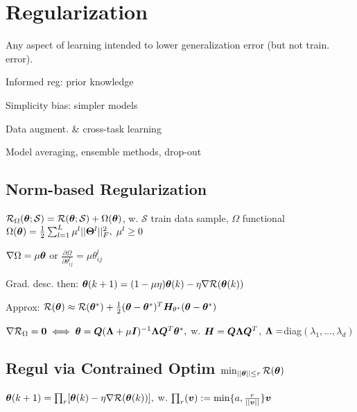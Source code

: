 \section{Regularization}
 Any aspect of learning intended to lower generalization error (but not train. error).

\begin{inparaitem}[$\color{mygreen} \triangleright$]
 \item Informed reg: prior knowledge \item Simplicity bias: simpler models \item Data augment. \& cross-task learning \item Model averaging, ensemble methods, drop-out
\end{inparaitem}

\subsection*{Norm-based Regularization}
$\mathcal{R}_\Omega(\boldsymbol{\theta};\mathcal{S})=\mathcal{R}(\boldsymbol{\theta};\mathcal{S})+\Omega(\boldsymbol{\theta})$, w. $\mathcal{S}$ train data sample, $\Omega$ functional
 $\Omega(\boldsymbol{\theta})=\frac{1}{2}\sum^L_{l=1}\mu^l||\boldsymbol{\Theta}^l||_F^2, \; \mu^l\geq 0$

$\nabla \Omega=\mu\boldsymbol{\theta}$ or $\frac{ \partial\Omega}{\partial \theta^l_{ij}}=\mu\theta^l_{ij}$

Grad. desc. then: $\boldsymbol{\theta}(k+1)=(1-\mu\eta)\boldsymbol{\theta}(k)-\eta\nabla \mathcal{R}(\boldsymbol{\theta}(k))$

Approx: $\mathcal{R}(\boldsymbol{\theta})\approx \mathcal{R}(\boldsymbol{\theta}^*)+\frac{1}{2}(\boldsymbol{\theta}-\boldsymbol{\theta}^*)^T\boldsymbol{H}_{\theta^*}(\boldsymbol{\theta}-\boldsymbol{\theta}^*)$

$\nabla \mathcal{R}_{\Omega}=\boldsymbol{0}\iff \boldsymbol{\theta}=\boldsymbol{Q}(\boldsymbol{\Lambda}+\mu \boldsymbol{I})^{-1}\boldsymbol{\Lambda}\boldsymbol{Q}^T\boldsymbol{\theta}^*,$ w. $\boldsymbol{H}=\boldsymbol{Q}\boldsymbol{\Lambda}\boldsymbol{Q}^T$, $\boldsymbol{\Lambda}=$diag$(\lambda_1,\dots,\lambda_d)$

\subsection*{Regul via Contrained Optim $\min_{||\boldsymbol{\theta}||\leq r}\mathcal{R}(\boldsymbol{\theta})$}

$\boldsymbol{\theta}(k+1)=\prod_r[\boldsymbol{\theta}(k)-\eta\nabla\mathcal{R}(\boldsymbol{\theta}(k))],$ w. $\prod_r(\boldsymbol{v}):=\min \{a,\frac{r}{||\boldsymbol{v}||}\}\boldsymbol{v}$

